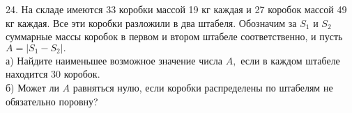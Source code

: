 24. На складе имеются 33 коробки массой 19 кг каждая и 27 коробок массой 49 кг каждая. Все эти коробки разложили в два штабеля. Обозначим за $S_1$ и $S_2$ суммарные массы коробок в первом и втором штабеле соответственно, и пусть $A=|S_1-S_2|.$\\
а) Найдите наименьшее возможное значение числа $A,$ если в каждом штабеле находится 30 коробок.\\
б) Может ли $A$ равняться нулю, если коробки распределены по штабелям не обязательно поровну?\\

